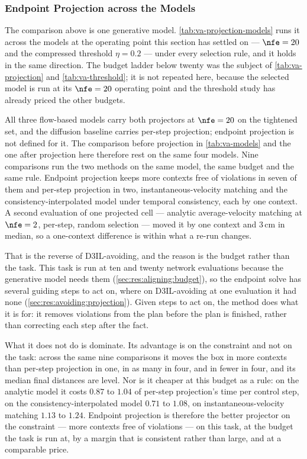 \subsubsection{Endpoint Projection across the Models}\label{sec:res:aligning:projection:models}

The comparison above is one generative model. \autoref{tab:va-projection-models} runs it across the
models at the operating point this section has settled on --- $\nfe=20$ and the compressed threshold
$\eta=0.2$ --- under every selection rule, and it holds in the same direction. The budget ladder below
twenty was the subject of \autoref{tab:va-projection} and \autoref{tab:va-threshold}; it is not repeated
here, because the selected model is run at its $\nfe=20$ operating point and the threshold study has already priced
the other budgets.

All three flow-based models carry both projectors at $\nfe=20$ on the tightened set, and the diffusion
baseline carries per-step projection; endpoint projection is not defined for it. The comparison before
projection in \autoref{tab:va-models} and the one after projection here therefore rest on the same four
models.
Nine comparisons run the two methods on the same model, the same budget and the same rule. Endpoint
projection keeps more contexts free of violations in seven of them and per-step projection in two,
instantaneous-velocity matching and the consistency-interpolated model under temporal consistency, each by
one context. A second evaluation of one projected cell --- analytic average-velocity matching at
$\nfe=2$, per-step, random selection --- moved it by one context and $3$\,cm in median, so a one-context
difference is within what a re-run changes.

That is the reverse of D3IL-avoiding, and the reason is the budget rather than the task. This task is
run at ten and twenty network evaluations because the generative model needs them
(\autoref{sec:res:aligning:budget}), so the endpoint solve has several guiding steps to act on, where on
D3IL-avoiding at one evaluation it had none (\autoref{sec:res:avoiding:projection}). Given steps to act
on, the method does what it is for: it removes violations from the plan before the plan is finished,
rather than correcting each step after the fact.

What it does not do is dominate. Its advantage is on the constraint and not on the task: across the same
nine comparisons it moves the box in more contexts than per-step projection in one, in as many in four,
and in fewer in four, and its median final distances are level. Nor is it cheaper at this budget as a
rule: on the analytic model it costs $0.87$ to $1.04$ of per-step projection's time per control step, on
the consistency-interpolated model $0.71$ to $1.08$, on instantaneous-velocity matching $1.13$ to $1.24$.
Endpoint projection is therefore the better projector on the constraint --- more contexts free of violations --- on this task, at the budget the
task is run at, by a margin that is consistent rather than large, and at a comparable price.

